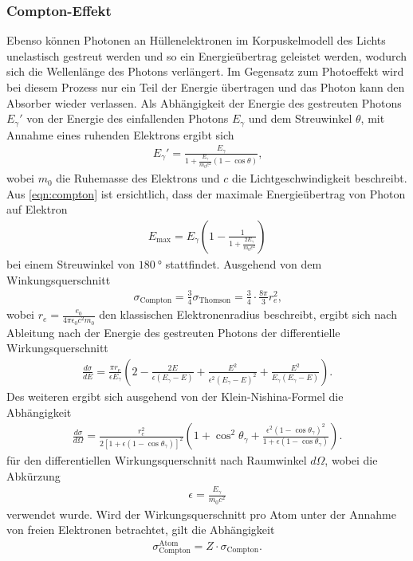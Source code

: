\subsubsection{Compton-Effekt}
Ebenso können Photonen an Hüllenelektronen im Korpuskelmodell des Lichts unelastisch gestreut werden und so ein Energieübertrag geleistet werden, wodurch sich die Wellenlänge des Photons verlängert. Im Gegensatz zum Photoeffekt wird bei diesem Prozess nur ein Teil der Energie übertragen und das Photon kann den Absorber wieder verlassen.
Als Abhängigkeit der Energie des gestreuten Photons $E_\gamma'$ von der Energie des einfallenden Photons $E_\gamma$ und dem Streuwinkel $\theta$, mit Annahme eines ruhenden Elektrons ergibt sich
\begin{align}
  E_\gamma' = \frac{E_\gamma}{1+\frac{E_\gamma}{m_0c^2}(1-\cos{\theta})}\text{,}\label{eqn:compton}
\end{align}
wobei $m_0$ die Ruhemasse des Elektrons und $c$ die Lichtgeschwindigkeit beschreibt.
Aus \autoref{eqn:compton} ist ersichtlich, dass der maximale Energieübertrag von Photon auf Elektron
\begin{align}
  E_{\text{max}} = E_\gamma\left(1-\frac{1}{1+\frac{2E_\gamma}{m_0c^2}}\right)\label{eqn:Comptonmax}
\end{align}
bei einem Streuwinkel von $\SI{180}{\degree}$ stattfindet.
Ausgehend von dem Winkungsquerschnitt 
\begin{align}
  \sigma_\text{Compton}=\frac{3}{4} \sigma_\text{Thomson} = \frac{3}{4}\cdot\frac{8\pi}{3}r_e^2\text{,}
\end{align}
wobei $r_e= \frac{e_0}{4\pi\epsilon_0c^2m_0}$ den klassischen Elektronenradius beschreibt, ergibt sich nach Ableitung nach der Energie des gestreuten Photons der differentielle Wirkungsquerschnitt
\begin{align}
  \frac{d \sigma}{d E} = \frac{\pi r_{\text{e}}}{\epsilon E_\gamma} \left(2 - \frac{2 E}{\epsilon \left(E_\gamma - E \right)}+ \frac{E^2}{\epsilon^2 \left(E_\gamma - E \right)^2} + \frac{E^2}{E_\gamma \left(E_\gamma - E \right)}\right).
  \label{eqn:Wirkungsquerschnitt}
\end{align}
Des weiteren ergibt sich ausgehend von der Klein-Nishina-Formel die Abhängigkeit
\begin{align}
  \frac{d \sigma}{d \Omega}=\frac{r_e^2}{2\left[1+\epsilon\left(1-\cos \theta_\gamma\right)\right]^2}\left(1+\cos ^2 \theta_\gamma+\frac{\epsilon^2\left(1-\cos \theta_\gamma\right)^2}{1+\epsilon\left(1-\cos \theta_\gamma\right)}\right).
\end{align}
für den differentiellen Wirkungsquerschnitt nach Raumwinkel $d\Omega$, wobei die Abkürzung 
\begin{align*}
  \epsilon=\frac{E_\gamma}{m_0c^2} 
\end{align*}
verwendet wurde.
Wird der Wirkungsquerschnitt pro Atom unter der Annahme von freien Elektronen betrachtet, gilt die Abhängigkeit
\begin{align}
  \sigma_\text{Compton}^\text{Atom}=Z\cdot \sigma_\text{Compton}\text{.}
\end{align}
